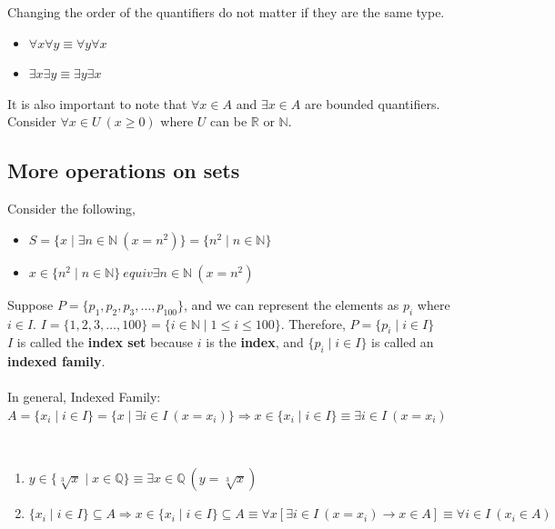 \documentclass[../setup.tex]{subfiles}
\begin{document}
\begin{remark}
Changing the order of the quantifiers do not matter if they are the same type.
\begin{itemize}
	\item $\forall x\forall y \equiv \forall y\forall x$
	\item $\exists x\exists y \equiv \exists y\exists x$
\end{itemize}
It is also important to note that $\forall x \in A$ and $\exists x \in A$ are bounded quantifiers. Consider $\forall x \in U \ (x\geq 0)$ where $U$ can be $\mathbb{R}$ or $\mathbb{N}$.
\end{remark}


\subsection{More operations on sets}
Consider the following, 
\begin{itemize}
	\item $S = \{x \mid \exists n \in \mathbb{N} \ (x = n^2)\} = \{n^2 \mid n \in \mathbb{N}\}$
	\item $x \in \{n^2 \mid n \in \mathbb{N}\} \ equiv \exists n \in \mathbb{N} \ (x = n^2)$
\end{itemize}
Suppose $P = \{p_1, p_2, p_3, \dots, p_100\}$, and we can represent the elements as $p_i$ where $i \in I$. $I = \{1, 2, 3, \dots, 100\} = \{i \in \mathbb{N} \mid 1 \leq i \leq 100\}$. Therefore, $P = \{p_i \mid i \in I\}$ \\
$I$ is called the \textbf{index set} because $i$ is the \textbf{index}, and $\{p_i \mid i \in I\}$ is called an \textbf{indexed family}. \\
\\
In general, Indexed Family: $A = \{x_i \mid i \in I\} = \{x \mid \exists i \in I \ (x = x_i)\} \Rightarrow x \in \{x_i \mid i \in I\} \equiv \exists i \in I \ (x = x_i)$ 

\begin{example}
\phantom \\
\begin{enumerate}
	\item $y \in \{\sqrt[3]{x} \mid x \in \mathbb{Q}\} \equiv \exists x \in \mathbb{Q} \ (y=\sqrt[3]{x})$
	\item $\{x_i \mid i \in I\} \subseteq A \Rightarrow x \in \{x_i \mid i \in I\} \subseteq A \equiv \forall x\left[\exists i \in I \ (x = x_i) \rightarrow x \in A \right] \equiv \forall i \in I \ (x_i \in A)$
\end{enumerate}
\end{example}
\end{document}
